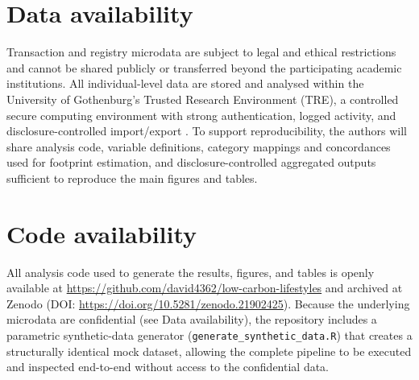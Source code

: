 \documentclass[sn-nature]{sn-jnl}
\begin{document}
\section{Data availability}
Transaction and registry microdata are subject to legal and ethical restrictions and cannot be shared publicly or transferred beyond the participating academic institutions. All individual-level data are stored and analysed within the University of Gothenburg’s Trusted Research Environment (TRE), a controlled secure computing environment with strong authentication, logged activity, and disclosure-controlled import/export \citep{GU_TRE_Consent,GU_TRE_SND_2025}. To support reproducibility, the authors will share analysis code, variable definitions, category mappings and concordances used for footprint estimation, and disclosure-controlled aggregated outputs sufficient to reproduce the main figures and tables.

\section{Code availability}
All analysis code used to generate the results, figures, and tables is openly available at \url{https://github.com/david4362/low-carbon-lifestyles} and archived at Zenodo (DOI: \url{https://doi.org/10.5281/zenodo.21902425}). Because the underlying microdata are confidential (see Data availability), the repository includes a parametric synthetic-data generator (\texttt{generate\_synthetic\_data.R}) that creates a structurally identical mock dataset, allowing the complete pipeline to be executed and inspected end-to-end without access to the confidential data.


\end{document}
